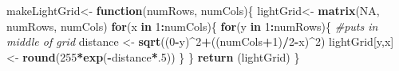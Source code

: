 \documentclass[]{article}
\newenvironment{Shaded}{\begin{snugshade}}{\end{snugshade}}
\newcommand{\CommentTok}[1]{\textcolor[rgb]{0.56,0.35,0.01}{\textit{#1}}}
\newcommand{\ControlFlowTok}[1]{\textcolor[rgb]{0.13,0.29,0.53}{\textbf{#1}}}
\newcommand{\DecValTok}[1]{\textcolor[rgb]{0.00,0.00,0.81}{#1}}
\newcommand{\KeywordTok}[1]{\textcolor[rgb]{0.13,0.29,0.53}{\textbf{#1}}}
\newcommand{\NormalTok}[1]{#1}
\newcommand{\OperatorTok}[1]{\textcolor[rgb]{0.81,0.36,0.00}{\textbf{#1}}}
\newcommand{\OtherTok}[1]{\textcolor[rgb]{0.56,0.35,0.01}{#1}}
\newcommand{\StringTok}[1]{\textcolor[rgb]{0.31,0.60,0.02}{#1}}
\begin{document}
\begin{Shaded}
\begin{Highlighting}[]
\NormalTok{makeLightGrid<-}\StringTok{ }\ControlFlowTok{function}\NormalTok{(numRows, numCols)\{}
\NormalTok{  lightGrid<-}\StringTok{ }\KeywordTok{matrix}\NormalTok{(}\OtherTok{NA}\NormalTok{, numRows, numCols)}
  \ControlFlowTok{for}\NormalTok{(x }\ControlFlowTok{in} \DecValTok{1}\OperatorTok{:}\NormalTok{numCols)\{}
    \ControlFlowTok{for}\NormalTok{(y }\ControlFlowTok{in} \DecValTok{1}\OperatorTok{:}\NormalTok{numRows)\{}
      \CommentTok{#puts in middle of grid}
\NormalTok{      distance <-}\StringTok{ }\KeywordTok{sqrt}\NormalTok{((}\DecValTok{0}\OperatorTok{-}\NormalTok{y)}\OperatorTok{^}\DecValTok{2}\OperatorTok{+}\NormalTok{((numCols}\OperatorTok{+}\DecValTok{1}\NormalTok{)}\OperatorTok{/}\DecValTok{2}\OperatorTok{-}\NormalTok{x)}\OperatorTok{^}\DecValTok{2}\NormalTok{)}
\NormalTok{      lightGrid[y,x] <-}\StringTok{ }\KeywordTok{round}\NormalTok{(}\DecValTok{255}\OperatorTok{*}\KeywordTok{exp}\NormalTok{(}\OperatorTok{-}\NormalTok{distance}\OperatorTok{*}\NormalTok{.}\DecValTok{5}\NormalTok{))}
\NormalTok{    \}}
\NormalTok{  \}}
  \KeywordTok{return}\NormalTok{ (lightGrid)}
\NormalTok{\}}


\end{Highlighting}
\end{Shaded}
\end{document}
